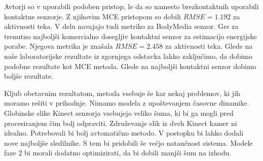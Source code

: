 Avtorji so v \cite{gjoreski2015context} uporabili podoben pristop, le da so namesto brezkontaktnih uporabili kontaktne senzorje. Z njihovim MCE pristopom so dobili $RMSE=1.192$ za aktivnosti teka. V delu navajajo tudi metriko za BodyMedia senzor. Gre za trenutno najboljši komercialno dosegljiv kontaktni senzor za estimacijo energijske porabe. Njegova metrika je znašala $RMSE=2.458$ za aktivnosti teka. Glede na naše laboratorijske rezultate iz zgornjega odstavka lahko zaključimo, da dobimo podobne rezultate kot MCE metoda. Glede na najboljši kontaktni senzor dobimo boljše rezultate.

Kljub obetavnim rezultatom, metoda vsebuje še kar nekaj problemov, ki jih moramo rešiti v prihodnje. Nimamo modela z upoštevanjem časovne dinamike. Globinske slike Kinect senzorja vsebujejo veliko šuma, ki bi ga mogli pred procesiranjem čim bolj odpraviti. Združevanje slik iz dveh Kinect kamer ni idealno. Potrebovali bi bolj avtomatično metodo. V postopku bi lahko dodali nove najboljše sledilnike. S tem bi pridobili še večjo natančnost sistema. Modele faze 2 bi morali dodatno optimizirati, da bi dobili manjši šum na izhodu.